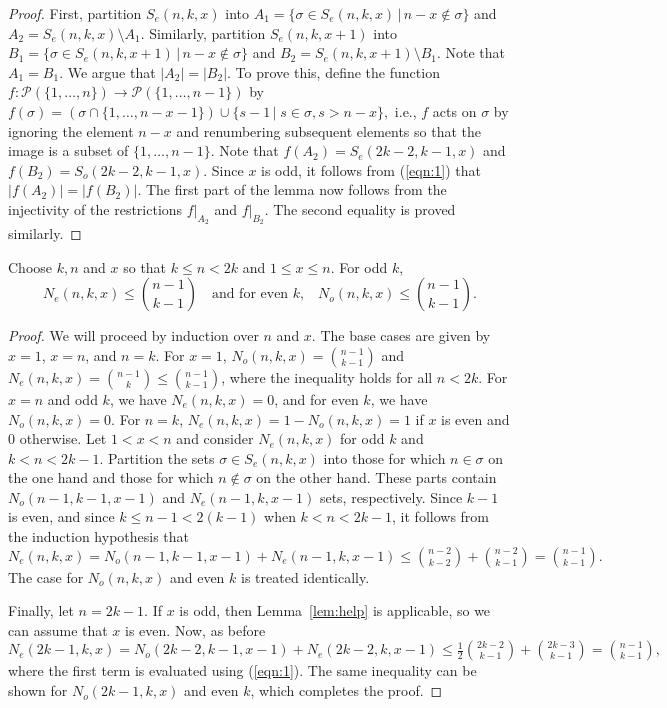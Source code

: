 \documentclass[11pt,a4paper]{article}
\begin{document}
  \begin{proof}
    First, partition $S_e(n,k,x)$ into $A_1 = \{ \sigma \in S_e(n,k,x) \,|\, n-x \not\in \sigma \}$ and $A_2 = S_e(n,k,x) \setminus A_1$.
    Similarly, partition $S_e(n,k,x+1)$ into $B_1 = \{ \sigma \in S_e(n,k,x+1) \,|\, n-x \not\in \sigma \}$ and $B_2 = S_e(n,k,x+1) \setminus B_1$.
    Note that $A_1 = B_1$.
    We argue that $|A_2| = |B_2|$.
    To prove this, define the function $f : \mathcal{P}(\{1,\ldots,n\}) \rightarrow \mathcal{P}(\{1,\ldots,n-1\})$ by
$f(\sigma) = (\sigma \cap \{1, \ldots, n-x-1\}) \cup \{ s-1 \,|\; s \in \sigma, s > n-x \},$
i.e., $f$ acts on $\sigma$ by ignoring the element $n-x$ and renumbering
    subsequent elements so that the image is a subset of $\{1, \ldots, n-1\}$.
    Note that $f(A_2) = S_e(2k-2,k-1,x)$ and $f(B_2) = S_o(2k-2,k-1,x)$.
    Since $x$ is odd, it follows from (\ref{eqn:1}) that
    $|f(A_2)| = |f(B_2)|$.
    The first part of the lemma now follows from the injectivity of
    the restrictions $f|_{A_2}$ and $f|_{B_2}$.
    The second equality is proved similarly.
\end{proof}

  \begin{lemma} \label{lem:ineq}
    Choose $k, n$ and $x$ so that $k \leq n < 2k$ and $1 \leq x \leq n$.
    For odd $k$,
    \begin{equation}
    N_e(n,k,x) \leq \binom{n-1}{k-1} \quad \text{and for even $k$,} \quad N_o(n,k,x) \leq \binom{n-1}{k-1}.
    \end{equation}
\end{lemma}
  
  \begin{proof}
    We will proceed by induction over $n$ and $x$.
    The base cases are given by $x = 1$, $x = n$, and $n = k$.
    For $x = 1$,
$N_o(n,k,x) = \binom{n-1}{k-1}$ and $N_e(n,k,x) = \binom{n-1}{k} \leq \binom{n-1}{k-1}$,
where the inequality holds for all $n < 2k$.
    For $x = n$ and odd $k$, we have $N_e(n,k,x) = 0$, and for
    even $k$, we have $N_o(n,k,x) = 0$.
    For $n = k$,
$N_e(n,k,x) = 1-N_o(n,k,x) = 1$ if $x$ is even and 0 otherwise.
Let $1 < x < n$ and consider $N_e(n,k,x)$ for odd $k$ and $k < n < 2k-1$.
    Partition the sets $\sigma \in S_e(n,k,x)$ into those for which 
    $n \in \sigma$ on the one hand and those for which
    $n \not\in \sigma$ on the other hand.
    These parts contain $N_o(n-1,k-1,x-1)$ and $N_e(n-1,k,x-1)$ sets,
    respectively.
    Since $k-1$ is even, and since $k \leq n-1 < 2(k-1)$ when $k < n < 2k-1$, 
    it follows from the induction hypothesis that
$N_e(n,k,x) =
      N_o(n-1,k-1,x-1) + N_e(n-1,k,x-1) \leq
      \binom{n-2}{k-2} + \binom{n-2}{k-1} = \binom{n-1}{k-1}.$
The case for $N_o(n,k,x)$ and even $k$ is treated identically.

    Finally, let $n = 2k-1$.
    If $x$ is odd, then Lemma~\ref{lem:help} is applicable, 
    so we can assume that $x$ is even.
Now, as before
$N_e(2k-1,k,x) =
    N_o(2k-2,k-1,x-1) + N_e(2k-2,k,x-1) \leq  
    \frac{1}{2} \binom{2k-2}{k-1} + \binom{2k-3}{k-1} = \binom{n-1}{k-1},$
where the first term is evaluated using (\ref{eqn:1}).
    The same inequality can be shown for $N_o(2k-1,k,x)$
    and even $k$,
    which completes the proof.
\end{proof}
\end{document}
